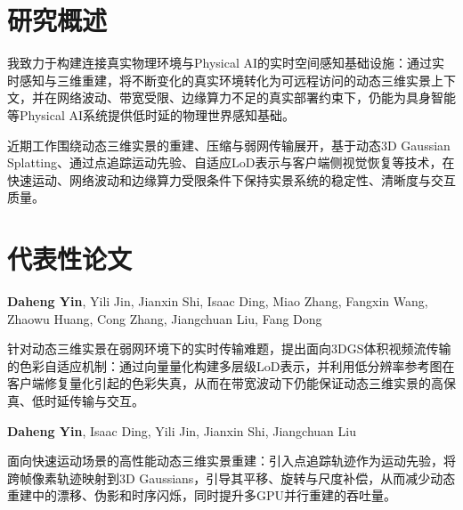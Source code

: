 \documentclass[]{deedy-resume-openfont}
\begin{document}
\begin{minipage}[t]{0.75\textwidth}

\section{研究概述}
\begin{tightemize}
\item 我致力于构建连接真实物理环境与Physical AI的实时空间感知基础设施：通过实时感知与三维重建，将不断变化的真实环境转化为可远程访问的动态三维实景上下文，并在网络波动、带宽受限、边缘算力不足的真实部署约束下，仍能为具身智能等Physical AI系统提供低时延的物理世界感知基础。
\item 近期工作围绕动态三维实景的重建、压缩与弱网传输展开，基于动态3D Gaussian Splatting、通过点追踪运动先验、自适应LoD表示与客户端侧视觉恢复等技术，在快速运动、网络波动和边缘算力受限条件下保持实景系统的稳定性、清晰度与交互质量。
\end{tightemize}

\section{代表性论文}
\begin{tightemize}
  \item \textbf{Daheng Yin}, Yili Jin, Jianxin Shi, Isaac Ding, Miao Zhang, Fangxin Wang, Zhaowu Huang, Cong Zhang, Jiangchuan Liu, Fang Dong
  \item 针对动态三维实景在弱网环境下的实时传输难题，提出面向3DGS体积视频流传输的色彩自适应机制：通过向量量化构建多层级LoD表示，并利用低分辨率参考图在客户端修复量化引起的色彩失真，从而在带宽波动下仍能保证动态三维实景的高保真、低时延传输与交互。
\end{tightemize}

\begin{tightemize}
  \item \textbf{Daheng Yin}, Isaac Ding, Yili Jin, Jianxin Shi, Jiangchuan Liu
  \item 面向快速运动场景的高性能动态三维实景重建：引入点追踪轨迹作为运动先验，将跨帧像素轨迹映射到3D Gaussians，引导其平移、旋转与尺度补偿，从而减少动态重建中的漂移、伪影和时序闪烁，同时提升多GPU并行重建的吞吐量。
\end{tightemize}


\end{minipage}
\end{document}
